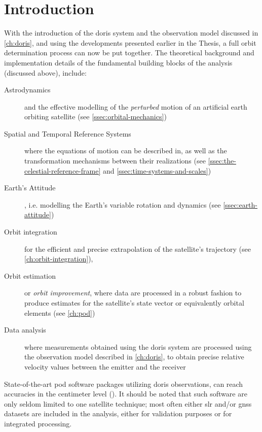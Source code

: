 \section{Introduction}\label{sec:podwdoris-introduction}

With the introduction of the \gls{doris} system and the observation model 
discussed in \autoref{ch:doris}, and using the developments presented earlier 
in the Thesis, a full orbit determination process can now be put together. The 
theoretical background and implementation details of the fundamental building 
blocks of the analysis (discussed above), include:
\begin{description}
  \item[Astrodynamics] and the effective modelling of the \emph{perturbed} motion 
    of an artificial earth orbiting satellite (see \autoref{ssec:orbital-mechanics})
  \item[Spatial and Temporal Reference Systems] where the equations of motion 
    can be described in, as well as the transformation mechanisms between their 
    realizations (see \autoref{ssec:the-celestial-reference-frame} and 
    \autoref{ssec:time-systems-and-scales})
  \item[Earth's Attitude], i.e. modelling the Earth's variable rotation and dynamics 
    (see \autoref{ssec:earth-attitude})
  \item[Orbit integration] for the efficient and precise extrapolation of the 
    satellite's trajectory (see \autoref{ch:orbit-integration}),
  \item[Orbit estimation] or \emph{orbit improvement}, where data are processed in 
    a robust fashion to produce estimates for the satellite's state vector or 
    equivalently orbital elements (see \autoref{ch:pod})
  \item[Data analysis] where measurements obtained using the \gls{doris} system are 
    processed using the observation model described in \autoref{ch:doris}, to obtain 
    precise relative velocity values between the emitter and the receiver
\end{description}

State-of-the-art \gls{pod} software packages utilizing \gls{doris} observations, 
can reach accuracies in the centimeter level (\cite{Rudenko2023}). It should be 
noted that such software are only seldom limited to one satellite technique; most 
often either \gls{slr} and/or \gls{gnss} datasets are included in the analysis, 
either for validation purposes or for integrated processing.

